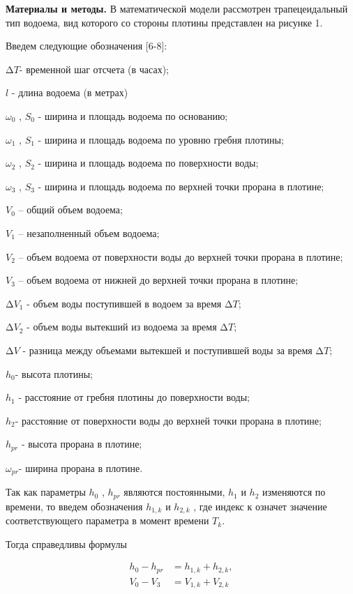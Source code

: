 \begin{multicols}{2}
{\bfseries Материалы и методы.} В математической модели рассмотрен
трапецеидальный тип водоема, вид которого со стороны плотины представлен
на рисунке 1.

Введем следующие обозначения {[}6-8{]}:

\(\mathrm{\Delta}T\)- временной шаг отсчета (в часах);

\(l\) - длина водоема (в метрах)

\(\omega_{0}\) , \(S_{0}\) - ширина и площадь водоема по основанию;

\(\omega_{1}\) , \(S_{1}\) - ширина и площадь водоема по уровню гребня
плотины;

\(\omega_{2}\) , \(S_{2}\) - ширина и площадь водоема по поверхности
воды;

\(\omega_{3}\) , \(S_{3}\) - ширина и площадь водоема по верхней точки
прорана в плотине;

\(V_{0}\) -- общий объем водоема;

\(V_{1}\) -- незаполненный объем водоема;

\(V_{2}\) -- объем водоема от поверхности воды до верхней точки прорана
в плотине;

\(V_{3}\) -- объем водоема от нижней до верхней точки прорана в плотине;

\(\mathrm{\Delta}V_{1}\) - объем воды поступившей в водоем за время
\(\mathrm{\Delta}T\);

\(\mathrm{\Delta}V_{2}\) - объем воды вытекший из водоема за время
\(\mathrm{\Delta}T\);

\(\mathrm{\Delta}V\) - разница между объемами вытекшей и поступившей
воды за время \(\mathrm{\Delta}T\);

\(h_{0}\)- высота плотины;

\(h_{1}\) - расстояние от гребня плотины до поверхности воды;

\(h_{2}\)- расстояние от поверхности воды до верхней точки прорана в
плотине;

\(h_{pr}\) - высота прорана в плотине;

\(\omega_{pr}\)- ширина прорана в плотине.

Так как параметры \(h_{0}\) , \(h_{pr}\) являются постоянными, \(h_{1}\)
и \(h_{2}\) изменяются по времени, то введем обозначения \(h_{1,k}\) и
\(h_{2,k}\) , где индекс к означет значение соответствующего параметра в
момент времени \(T_{k}\).

Тогда справедливы формулы

\begin{equation}
\begin{aligned}
h_{0} - h_{pr} &= h_{1,k} + h_{2,k}, \\
V_{0} - V_{3} &= V_{1,k} + V_{2,k}
\end{aligned}
\end{equation}


\end{multicols}
